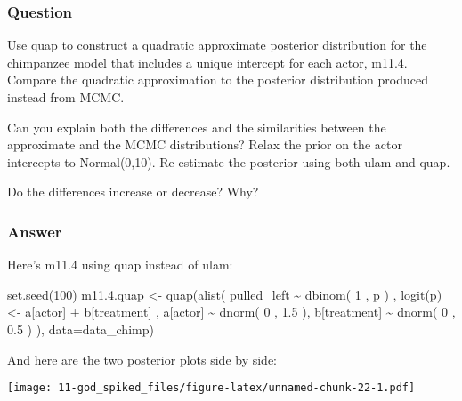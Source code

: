 \documentclass[
]{book}
\newenvironment{Shaded}{\begin{snugshade}}{\end{snugshade}}
\newcommand{\AttributeTok}[1]{\textcolor[rgb]{0.77,0.63,0.00}{#1}}
\newcommand{\DecValTok}[1]{\textcolor[rgb]{0.00,0.00,0.81}{#1}}
\newcommand{\FloatTok}[1]{\textcolor[rgb]{0.00,0.00,0.81}{#1}}
\newcommand{\FunctionTok}[1]{\textcolor[rgb]{0.00,0.00,0.00}{#1}}
\newcommand{\NormalTok}[1]{#1}
\newcommand{\OtherTok}[1]{\textcolor[rgb]{0.56,0.35,0.01}{#1}}
\newcommand{\SpecialCharTok}[1]{\textcolor[rgb]{0.00,0.00,0.00}{#1}}
\begin{document}
\hypertarget{question-91}{%
\subsubsection*{Question}\label{question-91}}

Use quap to construct a quadratic approximate posterior distribution for the chimpanzee model that includes a unique intercept for each actor, m11.4. Compare the quadratic approximation to the posterior distribution produced instead from MCMC.

Can you explain both the differences and the similarities between the approximate and the MCMC distributions? Relax the prior on the actor intercepts to Normal(0,10). Re-estimate the posterior using both ulam and quap.

Do the differences increase or decrease? Why?

\hypertarget{answer-91}{%
\subsubsection*{Answer}\label{answer-91}}

Here's m11.4 using quap instead of ulam:

\begin{Shaded}
\begin{Highlighting}[]
\FunctionTok{set.seed}\NormalTok{(}\DecValTok{100}\NormalTok{)}
\NormalTok{m11.}\FloatTok{4.}\NormalTok{quap }\OtherTok{\textless{}{-}} \FunctionTok{quap}\NormalTok{(}\FunctionTok{alist}\NormalTok{( }
\NormalTok{  pulled\_left }\SpecialCharTok{\textasciitilde{}} \FunctionTok{dbinom}\NormalTok{( }\DecValTok{1}\NormalTok{ , p ) , }
  \FunctionTok{logit}\NormalTok{(p) }\OtherTok{\textless{}{-}}\NormalTok{ a[actor] }\SpecialCharTok{+}\NormalTok{ b[treatment] , }
\NormalTok{  a[actor] }\SpecialCharTok{\textasciitilde{}} \FunctionTok{dnorm}\NormalTok{( }\DecValTok{0}\NormalTok{ , }\FloatTok{1.5}\NormalTok{ ), }
\NormalTok{  b[treatment] }\SpecialCharTok{\textasciitilde{}} \FunctionTok{dnorm}\NormalTok{( }\DecValTok{0}\NormalTok{ , }\FloatTok{0.5}\NormalTok{ )}
\NormalTok{ ), }\AttributeTok{data=}\NormalTok{data\_chimp)}
\end{Highlighting}
\end{Shaded}

And here are the two posterior plots side by side:

\texttt{[image: 11-god\_spiked\_files/figure-latex/unnamed-chunk-22-1.pdf]}
\end{document}
